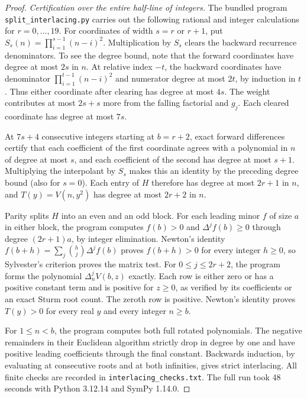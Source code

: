\begin{proof}
\emph{Certification over the entire half-line of integers.}
The bundled program \texttt{split\_interlacing.py} carries out the
following rational and integer calculations for $r=0,\ldots,19$.
For coordinates of width $s=r$ or $r+1$, put
$S_s(n)=\prod_{i=1}^{s-1}(n-i)^2$. Multiplication by $S_s$ clears the
backward recurrence denominators. To see the degree bound, note that the
forward coordinates have degree at most $2s$ in $n$. At relative index
$-t$, the backward coordinates have denominator
$\prod_{i=1}^{t-1}(n-i)^2$ and numerator degree at most $2t$, by
induction in $t$. Thus either coordinate after clearing has degree at
most $4s$. The weight contributes at most $2s+s$ more from the falling
factorial and $g_j$. Each cleared coordinate has degree at most $7s$.

At $7s+4$ consecutive integers starting at $b=r+2$, exact forward
differences certify that each coefficient of the first coordinate
agrees with a polynomial in $n$ of degree at most $s$, and each
coefficient of the second has degree at most $s+1$. Multiplying the
interpolant by $S_s$ makes this an identity by the preceding degree
bound (also for $s=0$). Each entry of $H$ therefore has degree at most
$2r+1$ in $n$, and $T(y)=V(n,y^2)$ has degree at most $2r+2$ in $n$.

Parity splits $H$ into an even and an odd block. For each leading minor
$f$ of size $a$ in either block, the program computes $f(b)>0$ and
$\Delta^j f(b)\ge0$ through degree $(2r+1)a$, by integer elimination.
Newton's identity $f(b+h)=\sum_j\binom hj\Delta^j f(b)$ proves $f(b+h)>0$
for every integer $h\ge0$, so Sylvester's criterion proves the matrix
test. For $0\le j\le2r+2$, the program forms the polynomial
$\Delta_n^jV(b,z)$ exactly. Each row is either zero or has a positive
constant term and is positive for $z\ge0$, as verified by its
coefficients or an exact Sturm root count. The zeroth row is positive.
Newton's identity proves $T(y)>0$ for every real $y$ and every integer
$n\ge b$.

For $1\le n<b$, the program computes both full rotated polynomials.
The negative remainders in their Euclidean algorithm strictly drop in
degree by one and have positive leading coefficients through the final
constant. Backwards induction, by evaluating at consecutive roots and at
both infinities, gives strict interlacing. All finite checks are recorded
in \texttt{interlacing\_checks.txt}. The full run took 48 seconds with Python
3.12.14 and SymPy 1.14.0.
\end{proof}
